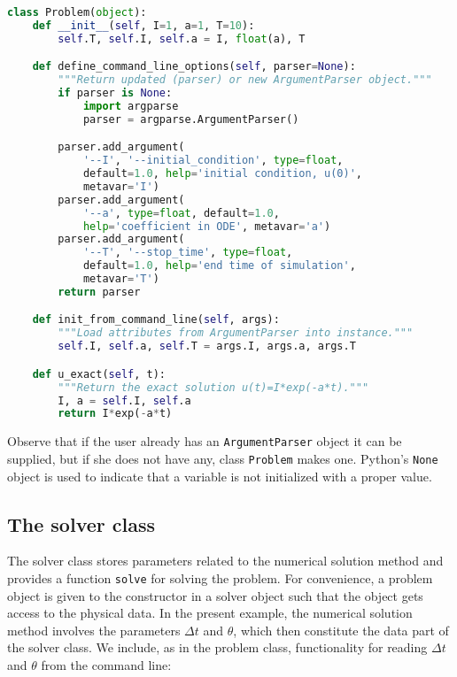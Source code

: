 \documentclass[graybox,sectrefs,envcountresetchap,open=right,final]{svmonodo}
\begin{document}
\begin{lstlisting}[language=Python,style=blue1_bluegreen]
class Problem(object):
    def __init__(self, I=1, a=1, T=10):
        self.T, self.I, self.a = I, float(a), T

    def define_command_line_options(self, parser=None):
        """Return updated (parser) or new ArgumentParser object."""
        if parser is None:
            import argparse
            parser = argparse.ArgumentParser()

        parser.add_argument(
            '--I', '--initial_condition', type=float,
            default=1.0, help='initial condition, u(0)',
            metavar='I')
        parser.add_argument(
            '--a', type=float, default=1.0,
            help='coefficient in ODE', metavar='a')
        parser.add_argument(
            '--T', '--stop_time', type=float,
            default=1.0, help='end time of simulation',
            metavar='T')
        return parser

    def init_from_command_line(self, args):
        """Load attributes from ArgumentParser into instance."""
        self.I, self.a, self.T = args.I, args.a, args.T

    def u_exact(self, t):
        """Return the exact solution u(t)=I*exp(-a*t)."""
        I, a = self.I, self.a
        return I*exp(-a*t)
\end{lstlisting}
Observe that if the user already has an \texttt{ArgumentParser} object it can be
supplied, but if she does not have any, class \texttt{Problem} makes one.
Python's \texttt{None} object is used to indicate that a variable is not
initialized with a proper value.

\subsection{The solver class}


The solver class stores parameters related to the numerical solution method
and provides a function \texttt{solve} for solving the problem.
For convenience, a problem object is given to the constructor
in a solver object such that the object gets access to the
physical data. In the present example,
the numerical solution method involves the parameters $\Delta t$
and $\theta$, which then constitute the data part of the solver class.
We include, as in the problem class, functionality for
reading $\Delta t$ and $\theta$ from the command line:
\end{document}
